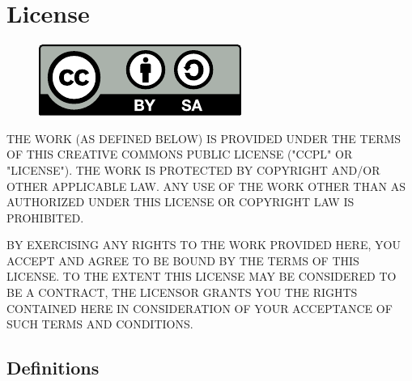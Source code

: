 \chapter{License}
\begin{figure}[h]
\includegraphics{logos/by-sa.pdf}
\end{figure}

THE WORK (AS DEFINED BELOW) IS PROVIDED UNDER THE TERMS
OF THIS CREATIVE COMMONS PUBLIC LICENSE ("CCPL" OR
"LICENSE"). THE WORK IS PROTECTED BY COPYRIGHT AND/OR OTHER
APPLICABLE LAW. ANY USE OF THE WORK OTHER THAN AS
AUTHORIZED UNDER THIS LICENSE OR COPYRIGHT LAW IS
PROHIBITED.

BY EXERCISING ANY RIGHTS TO THE WORK PROVIDED HERE, YOU
ACCEPT AND AGREE TO BE BOUND BY THE TERMS OF THIS LICENSE.
TO THE EXTENT THIS LICENSE MAY BE CONSIDERED TO BE A
CONTRACT, THE LICENSOR GRANTS YOU THE RIGHTS CONTAINED HERE
IN CONSIDERATION OF YOUR ACCEPTANCE OF SUCH TERMS AND
CONDITIONS.

\section{Definitions}

